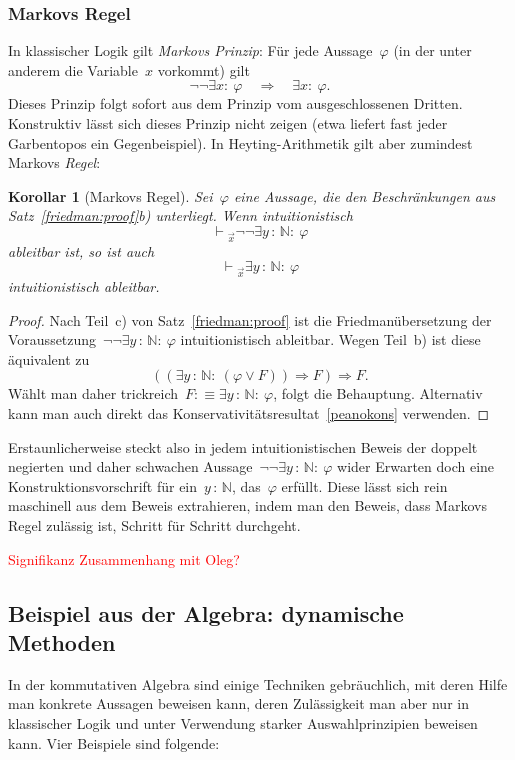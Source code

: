 \documentclass[a4paper,ngerman,12pt]{scrartcl}
\theoremstyle{definition}
\theoremstyle{plain}
\newtheorem{kor}[defn]{Korollar}
\theoremstyle{remark}
\newcommand{\NN}{\mathbb{N}}
\newcommand{\seq}[1]{\mathrel{\vdash\!\!\!_{#1}}}
\renewcommand{\_}{\mathpunct{.}\,}
\newcommand{\?}{\,{:}\,}
\newcommand{\XXX}[1]{\textcolor{red}{#1}}
\begin{document}
\subsubsection*{Markovs Regel}

In klassischer Logik gilt \emph{Markovs Prinzip}: Für jede Aussage~$\varphi$
(in der unter anderem die Variable~$x$ vorkommt) gilt
\[ \neg\neg \exists x{:}\ \varphi \quad\Longrightarrow\quad
  \exists x{:}\ \varphi. \]
Dieses Prinzip folgt sofort aus dem Prinzip vom ausgeschlossenen Dritten.
Konstruktiv lässt sich dieses Prinzip nicht zeigen (etwa liefert fast jeder
Garbentopos ein Gegenbeispiel). In Heyting-Arithmetik gilt aber zumindest
Markovs \emph{Regel}:

\begin{kor}[Markovs Regel]Sei~$\varphi$ eine Aussage, die den Beschränkungen
aus Satz~\ref{friedman:proof}b) unterliegt. Wenn intuitionistisch
\[ \seq{\vec x} \neg\neg\exists y\?\NN{:}\ \varphi \]
ableitbar ist, so ist auch
\[ \seq{\vec x} \exists y\?\NN{:}\ \varphi \]
intuitionistisch ableitbar.\end{kor}
\begin{proof}Nach Teil~c) von Satz~\ref{friedman:proof} ist die
Friedmanübersetzung der Voraussetzung~$\neg\neg\exists
y\?\NN{:}\ \varphi$ intuitionistisch ableitbar. Wegen Teil~b) ist diese äquivalent zu
\[ ((\exists y\?\NN{:}\ (\varphi \vee F)) \Rightarrow F) \Rightarrow F. \]
Wählt man daher trickreich~$F :\equiv \exists y\?\NN{:}\ \varphi$, folgt die Behauptung.
Alternativ kann man auch direkt das Konservativitätsresultat~\ref{peanokons}
verwenden.
\end{proof}

Erstaunlicherweise steckt also in jedem intuitionistischen Beweis der doppelt
negierten und daher schwachen Aussage~$\neg\neg \exists y\?\NN{:}\ \varphi$
wider Erwarten doch eine Konstruktionsvorschrift für ein~$y\?\NN$, das~$\varphi$
erfüllt. Diese lässt sich rein maschinell aus dem Beweis extrahieren, indem man
den Beweis, dass Markovs Regel zulässig ist, Schritt für Schritt durchgeht.

\XXX{Signifikanz}
\XXX{Zusammenhang mit Oleg?}


\subsection{Beispiel aus der Algebra: dynamische Methoden}

In der kommutativen Algebra sind einige Techniken gebräuchlich, mit deren Hilfe
man konkrete Aussagen beweisen kann, deren Zulässigkeit man aber nur
in klassischer Logik und unter Verwendung starker Auswahlprinzipien beweisen
kann. Vier Beispiele sind folgende:
\end{document}
